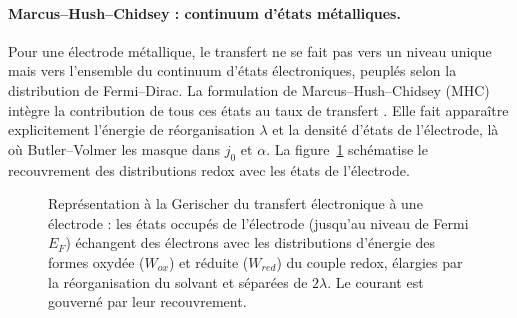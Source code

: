\paragraph{Marcus--Hush--Chidsey : continuum d'états métalliques.}
Pour une électrode métallique, le transfert ne se fait pas vers un niveau
unique mais vers l'ensemble du continuum d'états électroniques, peuplés selon
la distribution de Fermi--Dirac. La formulation de Marcus--Hush--Chidsey
(MHC) intègre la contribution de tous ces états au taux de transfert
\cite{henstridgeMarcusHushChidsey2012, kurchinMarcusHushChidsey2020}. Elle
fait apparaître explicitement l'énergie de réorganisation $\lambda$ et la
densité d'états de l'électrode, là où Butler--Volmer les masque dans $j_0$ et
$\alpha$. La figure~\ref{fig:gerischer} schématise le recouvrement des
distributions redox avec les états de l'électrode.

\begin{figure}[htbp]
\centering
{}
\caption{Représentation à la Gerischer du transfert électronique à une
électrode : les états occupés de l'électrode (jusqu'au niveau de Fermi $E_F$)
échangent des électrons avec les distributions d'énergie des formes oxydée
($W_{ox}$) et réduite ($W_{red}$) du couple redox, élargies par la
réorganisation du solvant et séparées de $2\lambda$. Le courant est gouverné
par leur recouvrement.}
\label{fig:gerischer}
\end{figure}

